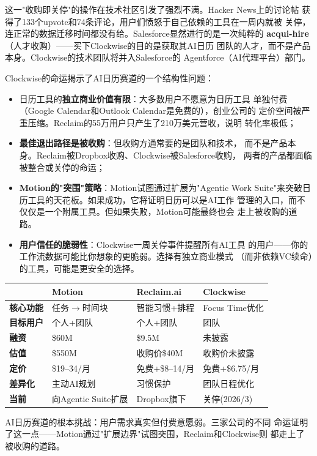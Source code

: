 这一"收购即关停"的操作在技术社区引发了强烈不满。Hacker News上的讨论帖
获得了133个upvote和74条评论，用户们愤怒于自己依赖的工具在一周内就被
关停，连正常的数据迁移时间都没有给。Salesforce显然进行的是一次纯粹的
\textbf{acqui-hire}（人才收购）——买下Clockwise的目的是获取其AI日历
团队的人才，而不是产品本身。Clockwise的技术团队将并入Salesforce的
Agentforce（AI代理平台）部门。

\begin{warnbox}
Clockwise的命运揭示了AI日历赛道的一个结构性问题：
\begin{itemize}
  \item 日历工具的\textbf{独立商业价值有限}：大多数用户不愿意为日历工具
    单独付费（Google Calendar和Outlook Calendar是免费的），创业公司的
    定价空间被严重压缩。Reclaim的55万用户只产生了210万美元营收，说明
    转化率极低；
  \item \textbf{最佳退出路径是被收购}：但收购方通常要的是团队和技术，
    而不是产品本身。Reclaim被Dropbox收购、Clockwise被Salesforce收购，
    两者的产品都面临被整合或关停的命运；
  \item \textbf{Motion的"突围"策略}：Motion试图通过扩展为"Agentic Work
    Suite"来突破日历工具的天花板。如果成功，它将证明日历可以是AI工作
    管理的入口，而不仅仅是一个附属工具。但如果失败，Motion可能最终也会
    走上被收购的道路。
  \item \textbf{用户信任的脆弱性}：Clockwise一周关停事件提醒所有AI工具
    的用户——你的工作流数据可能比你想象的更脆弱。选择有独立商业模式
    （而非依赖VC续命）的工具，可能是更安全的选择。
\end{itemize}
\end{warnbox}

\begin{keybox}[AI日历与排程赛道对比]
\small
\begin{tabularx}{\textwidth}{l X X X}
\toprule
\rowcolor{figLightGray}
& \textbf{Motion} & \textbf{Reclaim.ai} & \textbf{Clockwise} \\
\midrule
\textbf{核心功能} & 任务$\to$时间块 & 智能习惯+排程 & Focus Time优化 \\
\textbf{目标用户} & 个人+团队 & 个人+团队 & 团队 \\
\textbf{融资} & \$60M & \$9.5M & 未披露 \\
\textbf{估值} & \$550M & 收购价\$40M & 收购价未披露 \\
\textbf{定价} & \$19--34/月 & 免费+\$8--14/月 & 免费+\$6.75/月 \\
\textbf{差异化} & 主动AI规划 & 习惯保护 & 团队日程优化 \\
\textbf{当前} & 向Agentic Suite扩展 & Dropbox旗下 & 关停(2026/3) \\
\bottomrule
\end{tabularx}

\medskip
\noindent AI日历赛道的根本挑战：用户需求真实但付费意愿弱。三家公司的不同
命运证明了这一点——Motion通过"扩展边界"试图突围，Reclaim和Clockwise则
都走上了被收购的道路。
\end{keybox}

